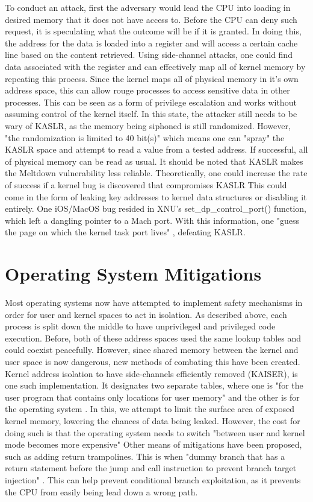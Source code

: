 \documentclass[conference]{IEEEtran}
\begin{document}
To conduct an attack, first the adversary would lead the CPU into loading in desired memory that it does not have access to.
Before the CPU can deny such request, it is speculating what the outcome will be if it is granted.
In doing this, the address for the data is loaded into a register and will access a certain cache line based on the content retrieved.
Using side-channel attacks, one could find data associated with the register and can effectively map all of kernel memory by repeating this process.
Since the kernel maps all of physical memory in it's own address space, this can allow rouge processes to access sensitive data in other processes.
This can be seen as a form of privilege escalation and works without assuming control of the kernel itself.
In this state, the attacker still needs to be wary of KASLR, as the memory being siphoned is still randomized.
However, "the randomization is limited to 40 bit(s)" which means one can "spray" the KASLR space and attempt to read a value from a tested address.
If successful, all of physical memory can be read as usual. It should be noted that KASLR makes the Meltdown vulnerability less reliable.
Theoretically, one could increase the rate of success if a kernel bug is discovered that compromises KASLR
This could come in the form of leaking key addresses to kernel data structures or disabling it entirely.
One iOS/MacOS bug resided in XNU's set\_dp\_control\_port() function, which left a dangling pointer to a Mach port.
With this information, one "guess the page on which the kernel task port lives" \autocite{tim_1970}, defeating KASLR.

\section{Operating System Mitigations}

Most operating systems now have attempted to implement safety mechanisms in order for user and kernel spaces to act in isolation.
As described above, each process is split down the middle to have unprivileged and privileged code execution.
Before, both of these address spaces used the same lookup tables and could coexist peacefully.
However, since shared memory between the kernel and user space is now dangerous, new methods of combating this have been created.
Kernel address isolation to have side-channels efficiently removed (KAISER), is one such implementation.
It designates two separate tables, where one is "for the user program that contains only locations for user memory" and the other is for the operating system \autocite[3]{SpectrePerformance}.
In this, we attempt to limit the surface area of exposed kernel memory, lowering the chances of data being leaked.
However, the cost for doing such is that the operating system needs to switch "between user and kernel mode becomes more expensive"  \autocite[3]{SpectrePerformance}
Other means of mitigations have been proposed, such as adding return trampolines.
This is when "dummy branch that has a return statement before the jump and call instruction to prevent branch target injection"  \autocite[3]{ijmsit526310}.
This can help prevent conditional branch exploitation, as it prevents the CPU from easily being lead down a wrong path.
\end{document}
